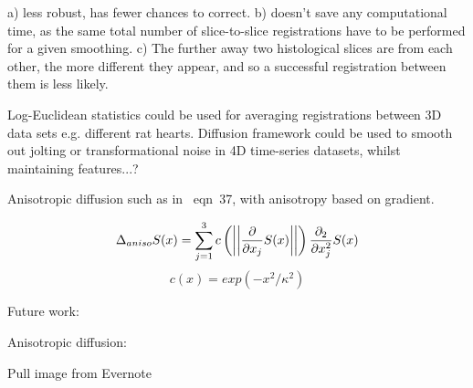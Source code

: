  a) less robust, has fewer chances to correct. b) doesn't save any computational time, as the same total number of slice-to-slice registrations have to be performed for a given smoothing. c) The further away two histological slices are from each other, the more different they appear, and so a successful registration between them is less likely.
  
  Log-Euclidean statistics could be used for averaging registrations between 3D data sets e.g. different rat hearts. Diffusion framework could be used to smooth out jolting or transformational noise in 4D time-series datasets, whilst maintaining features...?
  
  Anisotropic diffusion such as in~\cite{Arsigny2005} eqn~37, with anisotropy based on gradient.
  
  \begin{equation}
    \Delta_{aniso}S(x)  = \sum_{j=1}^3 c\left(\left|\left| \frac{\partial}{\partial x_j}S(x)\right|\right|\right) \\
                            \frac{\partial_2}{\partial x_j^2}S(x)
  \end{equation}
  \begin{equation}
    c(x) = exp(-x^2/\kappa^2)
  \end{equation}
  
  Future work:
  
  Anisotropic diffusion:
  
  Pull image from Evernote
  

